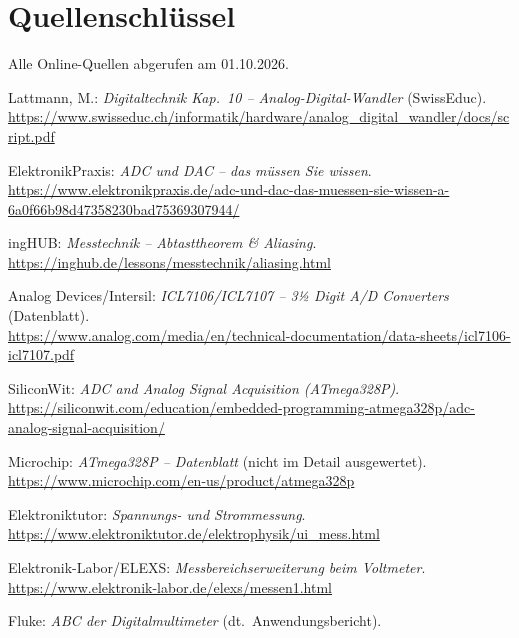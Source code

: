 \documentclass[11pt,a4paper]{article}
\newcommand{\qziel}[1]{\hypertarget{src:#1}{\texttt{[#1]}}}
\begin{document}
\section{Quellenschlüssel}\label{sec:quellen}
Alle Online-Quellen abgerufen am 01.10.2026. \small
\begin{description}[style=nextline,leftmargin=0pt,itemsep=3pt]
  \item[\qziel{SWISS}] Lattmann, M.: \emph{Digitaltechnik Kap.\ 10 -- Analog-Digital-Wandler} (SwissEduc).\\
    \url{https://www.swisseduc.ch/informatik/hardware/analog_digital_wandler/docs/script.pdf}
  \item[\qziel{EP}] ElektronikPraxis: \emph{ADC und DAC -- das müssen Sie wissen}.\\
    \url{https://www.elektronikpraxis.de/adc-und-dac-das-muessen-sie-wissen-a-6a0f66b98d47358230bad75369307944/}
  \item[\qziel{ING}] ingHUB: \emph{Messtechnik -- Abtasttheorem \& Aliasing}.\\
    \url{https://inghub.de/lessons/messtechnik/aliasing.html}
  \item[\qziel{ICL}] Analog Devices/Intersil: \emph{ICL7106/ICL7107 -- 3½ Digit A/D Converters} (Datenblatt).\\
    \url{https://www.analog.com/media/en/technical-documentation/data-sheets/icl7106-icl7107.pdf}
  \item[\qziel{SW}] SiliconWit: \emph{ADC and Analog Signal Acquisition (ATmega328P)}.\\
    \url{https://siliconwit.com/education/embedded-programming-atmega328p/adc-analog-signal-acquisition/}
  \item[\qziel{MCHP}] Microchip: \emph{ATmega328P -- Datenblatt} (nicht im Detail ausgewertet).\\
    \url{https://www.microchip.com/en-us/product/atmega328p}
  \item[\qziel{ET}] Elektroniktutor: \emph{Spannungs- und Strommessung}.\\
    \url{https://www.elektroniktutor.de/elektrophysik/ui_mess.html}
  \item[\qziel{EL}] Elektronik-Labor/ELEXS: \emph{Messbereichserweiterung beim Voltmeter}.\\
    \url{https://www.elektronik-labor.de/elexs/messen1.html}
  \item[\qziel{FLUKE}] Fluke: \emph{ABC der Digitalmultimeter} (dt.\ Anwendungsbericht).\\

\end{description}
\end{document}
